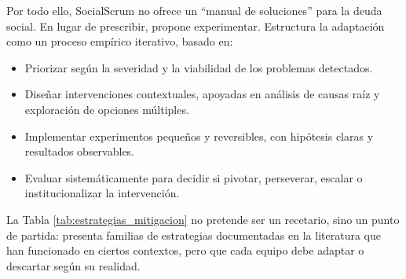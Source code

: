 Por todo ello, SocialScrum no ofrece un ``manual de soluciones'' para la deuda social.
En lugar de prescribir, propone experimentar.
Estructura la adaptación como un proceso empírico iterativo, basado en:

\begin{itemize}
    \item Priorizar según la severidad y la viabilidad de los problemas detectados.
    \item Diseñar intervenciones contextuales, apoyadas en análisis de causas raíz y exploración de opciones múltiples.
    \item Implementar experimentos pequeños y reversibles, con hipótesis claras y resultados observables.
    \item Evaluar sistemáticamente para decidir si pivotar, perseverar, escalar o institucionalizar la intervención.
\end{itemize}

La Tabla \ref{tab:estrategias_mitigacion} no pretende ser un recetario, sino un punto de partida: presenta familias de estrategias documentadas en la literatura que han funcionado en ciertos contextos, pero que cada equipo debe adaptar o descartar según su realidad.

\begingroup
\scriptsize
\setlength{\LTleft}{0pt} %
\setlength{\LTright}{0pt} %
\setlength{\tabcolsep}{4pt} %
\renewcommand{\arraystretch}{1.4}

